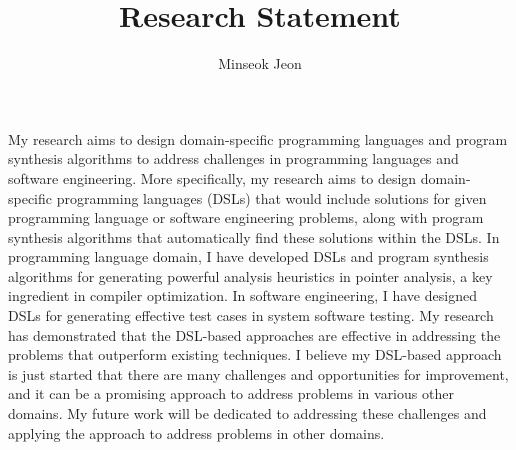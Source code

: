 \documentclass[11pt]{article}
\begin{document}
\title{Research Statement}
\author{Minseok Jeon}
\date{}


\newcommand{\DisjunctiveModel}{{``Disjunctive Model''}}
\newcommand{\FeatureLanguage}{{``Feature Language''}}
\newcommand{\GDL}{{``Graph Description Language''}}


\newcommand{\AbstractRelativeWritePattern}{{``Abstract Relative Write Pattern''}}

\maketitle 

My research aims to design domain-specific programming languages and program synthesis algorithms to address challenges in programming languages and software engineering. 
%
More specifically, my research aims to design domain-specific programming languages (DSLs) that would include solutions for given programming language or software engineering problems, along with program synthesis algorithms that automatically find these solutions within the DSLs.
%
In programming language domain, I have developed DSLs and program synthesis algorithms for generating powerful analysis heuristics in pointer analysis, a key ingredient in compiler optimization.
%
In software engineering, I have designed DSLs for generating effective test cases in system software testing.
%
My research has demonstrated that the DSL-based approaches are effective in addressing the problems that outperform existing techniques.
%
I believe my DSL-based approach is just started that there are many challenges and opportunities for improvement, and it can be a promising approach to address problems in various other domains.
%
My future work will be dedicated to addressing these challenges and applying the approach to address problems in other domains.
\end{document}
